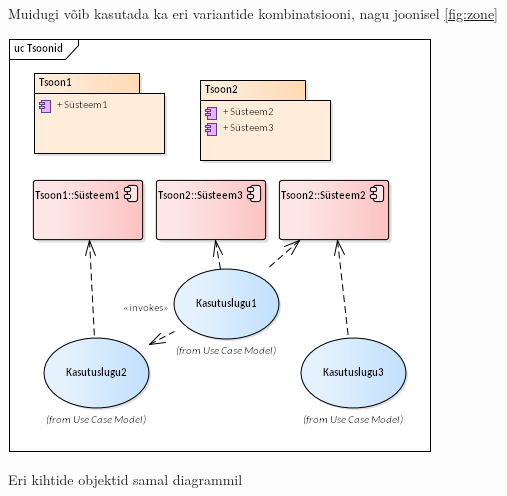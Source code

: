 \documentclass[nobib]{tufte-handout}
\begin{document}
Muidugi võib kasutada ka eri variantide kombinatsiooni, nagu joonisel \ref{fig:zone}

\begin{marginfigure}%
  \includegraphics[width=\linewidth]{tsoonid.png}
  \caption{Eri kihtide objektid samal diagrammil}
  \label{fig:zone}
\end{marginfigure}




\end{document}
